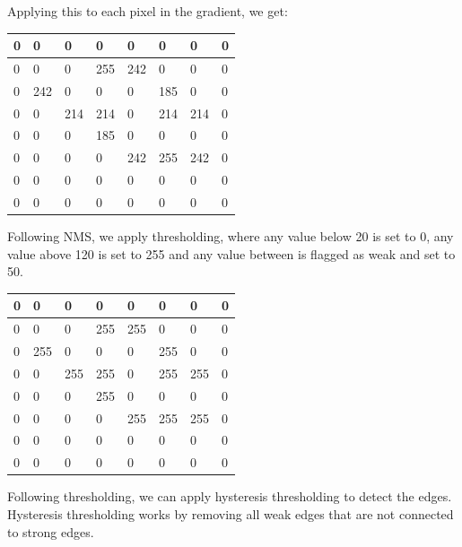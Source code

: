 \documentclass[12pt, letterpaper]{article}
\begin{document}
Applying this to each pixel in the gradient, we get:

\begin{table}[!ht]
    \centering
    \begin{tabular}{|l|l|l|l|l|l|l|l|}
    \hline
        0 & 0 & 0 & 0 & 0 & 0 & 0 & 0 \\ \hline
        0 & 0 & 0 & 255 & 242 & 0 & 0 & 0 \\ \hline
        0 & 242 & 0 & 0 & 0 & 185 & 0 & 0 \\ \hline
        0 & 0 & 214 & 214 & 0 & 214 & 214 & 0 \\ \hline
        0 & 0 & 0 & 185 & 0 & 0 & 0 & 0 \\ \hline
        0 & 0 & 0 & 0 & 242 & 255 & 242 & 0 \\ \hline
        0 & 0 & 0 & 0 & 0 & 0 & 0 & 0 \\ \hline
        0 & 0 & 0 & 0 & 0 & 0 & 0 & 0 \\ \hline
    \end{tabular}
\end{table}


Following NMS, we apply thresholding, where any value below 20 is set to 0, any value above 120 is set to 255 and any value between is flagged as weak and set to 50.

\begin{table}[!ht]
    \centering
    \begin{tabular}{|l|l|l|l|l|l|l|l|}
    \hline
        0 & 0 & 0 & 0 & 0 & 0 & 0 & 0 \\ \hline
        0 & 0 & 0 & 255 & 255 & 0 & 0 & 0 \\ \hline
        0 & 255 & 0 & 0 & 0 & 255 & 0 & 0 \\ \hline
        0 & 0 & 255 & 255 & 0 & 255 & 255 & 0 \\ \hline
        0 & 0 & 0 & 255 & 0 & 0 & 0 & 0 \\ \hline
        0 & 0 & 0 & 0 & 255 & 255 & 255 & 0 \\ \hline
        0 & 0 & 0 & 0 & 0 & 0 & 0 & 0 \\ \hline
        0 & 0 & 0 & 0 & 0 & 0 & 0 & 0 \\ \hline
    \end{tabular}
\end{table}

Following thresholding, we can apply hysteresis thresholding to detect the edges. Hysteresis thresholding works by removing all weak edges that are not connected to strong edges.
\end{document}
